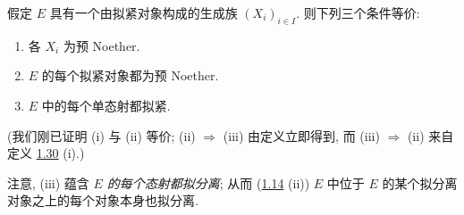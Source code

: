 假定 $E$ 具有一个由拟紧对象构成的生成族 $(X_i)_{i\in I}$.
则下列三个条件等价:
\begin{enumerate}
\renewcommand{\theenumi}{\roman{enumi}}
\renewcommand{\labelenumi}{(\theenumi)}
\item 各 $X_i$ 为预 Noether.

\item $E$ 的每个拟紧对象都为预 Noether.

\item $E$ 中的每个单态射都拟紧.
\end{enumerate}
\noindent
(我们刚已证明 (i) 与 (ii) 等价;
(ii) $\Rightarrow$ (iii) 由定义立即得到,
而 (iii) $\Rightarrow$ (ii) 来自定义 \hyperref[VI.def1.30]{1.30} (i).)

注意\pageoriginale{}, (iii) 蕴含 \emph{$E$ 的每个态射都拟分离};
从而 (\hyperref[VI.prop1.14]{1.14} (ii))
$E$ 中位于 $E$ 的某个拟分离对象之上的每个对象本身也拟分离.

